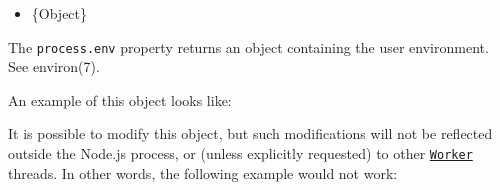 \begin{itemize}
\tightlist
\item
  \{Object\}
\end{itemize}

The \texttt{process.env} property returns an object containing the user
environment. See environ(7).

An example of this object looks like:

\begin{Shaded}
\begin{Highlighting}[]
\NormalTok{\{}
  \OperatorTok{:} \OperatorTok{,}
  \OperatorTok{:} \OperatorTok{,}
  \OperatorTok{:} \OperatorTok{,}
  \OperatorTok{:} \OperatorTok{,}
  \OperatorTok{:} \OperatorTok{,}
  \OperatorTok{:} \OperatorTok{,}
  \OperatorTok{:} \StringTok{\textquotesingle{}1\textquotesingle{}}\OperatorTok{,}
  \OperatorTok{:} \OperatorTok{,}
  \OperatorTok{:} \OperatorTok{,}
  \DataTypeTok{\_}\OperatorTok{:} 
\NormalTok{\}}
\end{Highlighting}
\end{Shaded}

It is possible to modify this object, but such modifications will not be
reflected outside the Node.js process, or (unless explicitly requested)
to other \href{worker_threads.md\#class-worker}{\texttt{Worker}}
threads. In other words, the following example would not work:

\begin{Shaded}
\begin{Highlighting}[]
   \KeywordTok{\&\&}  
\end{Highlighting}
\end{Shaded}

